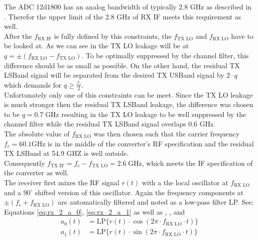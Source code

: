 The \gls{ADC} 12d1800 has an analog bandwidth of typically 2.8 GHz
as described in .
Therefor the upper limit of the 2.8 GHz of \gls{RX} \gls{IF} meets this
requirement as well. \\

After the $f_{\text{RX IF}}$ is fully defined by this constraints, the
$f_{\text{TX LO}}$ and $f_{\text{RX LO}}$ have to be looked at.
As we can see in  the \gls{TX} \gls{LO}
leakage will be at $q = \pm \left(f_{\text{RX LO}} - f_{\text{TX LO}} \right)$.
To be optimally suppressed by the channel filter, this difference should be as
small as possible. On the other hand, the residual \gls{TX} \gls{LSBand} signal
will be separated from the desired \gls{TX} \gls{USBand} signal by $2 \cdot q$
which demands for $q \geq \frac{f_s}{2}$. \\
Unfortunately only one of this constraints can be meet. Since the \gls{TX}
\gls{LO} leakage is much stronger then the residual \gls{TX} \gls{LSBand}
leakage, the difference was chosen to be $q = 0.7 \;\text{GHz}$ resulting in the
\gls{TX} \gls{LO} leakage to be well suppressed by the channel filter while
the residual \gls{TX} \gls{LSBand} signal overlaps 0.6 GHz. \\

The absolute value of $f_{\text{RX LO}}$ was then chosen such that the
carrier frequency $f_c = 60.1 \text{GHz}$ is in the middle of the
converter's \gls{RF} specification and the residual \gls{TX} \gls{LSBand}
at 54.9 GHZ is well outside. \\

Consequently $f_{\text{TX IF}} = f_c - f_{\text{TX LO}} = 2.6 \;\text{GHz}$,
which meets the \gls{IF} specification of the converter as well. \\

The receiver first mixes the \gls{RF} signal $r(t)$ with a the local oscillator
at $f_{\text{RX LO}}$ and a $90^\circ$ shifted version of this oscillator.
Again the frequency components at $\pm (f_c + f_{\text{RX LO}})$ are
automatically filtered and noted as a low-pass filter LP.
See: Equations \eqref{eq:rx_2_a_0}, \eqref{eq:rx_2_a_1} as well as
, ,
 and  \\

\begin{subequations}
  \begin{alignat}{2}
    a_0(t) &= \text{LP}\{r(t) \cdot \cos(2\pi \cdot f_{\text{RX LO}} \cdot t)\}
    \label{eq:rx_2_a_0} \\
    a_1(t) &= \text{LP}\{r(t) \cdot \sin(2\pi \cdot f_{\text{RX LO}} \cdot t)\}
    \label{eq:rx_2_a_1}
  \end{alignat}
\end{subequations}

